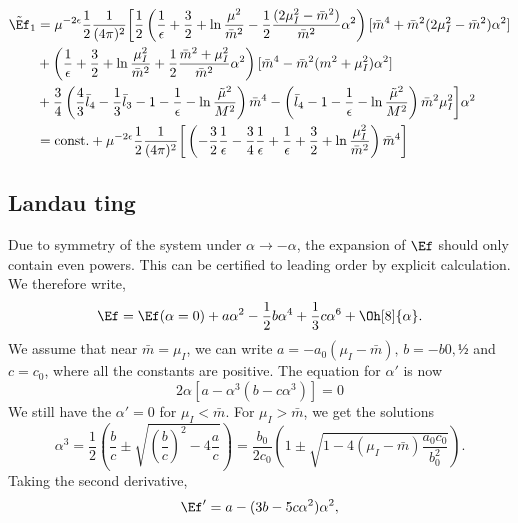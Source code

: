 \documentclass{article}
\begin{document}
\begin{align}
    \tilde \Ef_1
    & = 
    \mu^{-2\epsilon} \frac{1}{2} \frac{1}{(4\pi)^2}
    \bigg[
        \frac{1}{2}
        \left(
            \frac{1}{\epsilon} + \frac{3}{2} +\ln \frac{\mu^2}{\bar m^2} - \frac{1}{2} \frac{(2\mu_I^2 - \bar m^2)}{\bar m^2}\alpha^2
        \right)[\bar m^4 + \bar m^2 (2\mu_I^2 - \bar m^2)\alpha^2]
        \\
        & +
        \left(
            \frac{1}{\epsilon} + \frac{3}{2} +\ln \frac{\mu_I^2}{\bar m^2} + \frac{1}{2}\frac{\bar m^2 + \mu_I^2}{\bar m^2}\alpha^2
        \right)[\bar m^4 - \bar m^2(m^2 + \mu_I^2) \alpha^2]
        \\
        &
        +
        \frac{3}{4}
        \left(
            \frac{4}{3}\bar l_4 - \frac{1}{3}\bar l_3 - 1 - \frac{1}{\epsilon} 
            - \ln\frac{\tilde \mu^2}{M^2}
        \right)\bar m^4
        -
        \left(
            \bar l_4 - 1 - \frac{1}{\epsilon} - \ln\frac{\tilde \mu^2}{M^2}
        \right) 
        \bar m^2\mu_I^2
    \bigg] \alpha^2
    \\
    &=
    \mathrm{const.}
    +
    \mu^{-2\epsilon}\frac{1}{2} \frac{1}{(4\pi)^2}
    \bigg[
        \left(
            -\frac{3}{2}\frac{1}{\epsilon} - \frac{3}{4}\frac{1}{\epsilon} + \frac{1}{\epsilon}
            + \frac{3}{2} + \ln \frac{\mu_I^2}{\bar m^2} 
        \right)
        \bar m^4
    \bigg]
\end{align}


\subsection*{Landau ting}

Due to symmetry of the system under $\alpha \rightarrow -\alpha$, the expansion of $\Ef$ should only contain even powers.
This can be certified to leading order by explicit calculation.
We therefore write,
\begin{equation}
    \Ef = \Ef(\alpha = 0) + a \alpha^2 - \frac{1}{2} b \alpha^4 + \frac{1}{3} c \alpha^6
    + \Oh[8]{\alpha}.
\end{equation}
We assume that near $\bar m = \mu_I$, we can write $a = -a_0(\mu_I - \bar m), \, b = -b0 ,½$ and $c = c_0$, where all the constants are positive.
The equation for $\alpha'$ is now
\begin{equation}
    2\alpha [a - \alpha^3 (b - c \alpha^3 )] = 0
\end{equation}
We still have the $\alpha' = 0$ for $\mu_I < \bar m$.
For $\mu_I> \bar m$, we get the solutions
\begin{equation}
    \alpha^3 = \frac{1}{2} \left( \frac{b}{c} \pm \sqrt{\left(\frac{b}{c} \right)^2- 4 \frac{a}{c}} \right)
    = \frac{b_0}{2c_0} \left(1 \pm \sqrt{1- 4 (\mu_I - \bar m) \frac{a_0c_0}{b_0^2}} \right).
\end{equation}
Taking the second derivative, 
\begin{equation}
    \Ef' = a - (3 b - 5c \alpha^2)\alpha^2,
\end{equation}
\end{document}
